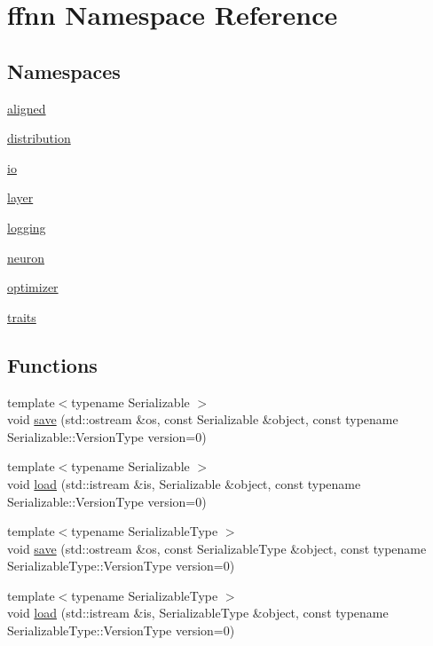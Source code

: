 \hypertarget{namespaceffnn}{\section{ffnn Namespace Reference}
\label{namespaceffnn}
}
\subsection*{Namespaces}
\begin{DoxyCompactItemize}
\item 
\hyperlink{namespaceffnn_1_1aligned}{aligned}
\item 
\hyperlink{namespaceffnn_1_1distribution}{distribution}
\item 
\hyperlink{namespaceffnn_1_1io}{io}
\item 
\hyperlink{namespaceffnn_1_1layer}{layer}
\item 
\hyperlink{namespaceffnn_1_1logging}{logging}
\item 
\hyperlink{namespaceffnn_1_1neuron}{neuron}
\item 
\hyperlink{namespaceffnn_1_1optimizer}{optimizer}
\item 
\hyperlink{namespaceffnn_1_1traits}{traits}
\end{DoxyCompactItemize}
\subsection*{Functions}
\begin{DoxyCompactItemize}
\item 
{\footnotesize template$<$typename Serializable $>$ }\\void \hyperlink{namespaceffnn_a1d292f830b9e27ce3965b0c18231b7fc}{save} (std\-::ostream \&os, const Serializable \&object, const typename Serializable\-::\-Version\-Type version=0)
\item 
{\footnotesize template$<$typename Serializable $>$ }\\void \hyperlink{namespaceffnn_a365753310c86d8142fa5b785cc16004a}{load} (std\-::istream \&is, Serializable \&object, const typename Serializable\-::\-Version\-Type version=0)
\item 
{\footnotesize template$<$typename Serializable\-Type $>$ }\\void \hyperlink{namespaceffnn_a25c692ab6bf9799deb7c4282ee85bdd6}{save} (std\-::ostream \&os, const Serializable\-Type \&object, const typename Serializable\-Type\-::\-Version\-Type version=0)
\item 
{\footnotesize template$<$typename Serializable\-Type $>$ }\\void \hyperlink{namespaceffnn_a94ff5b786bc42fa02bcf27ed86854a71}{load} (std\-::istream \&is, Serializable\-Type \&object, const typename Serializable\-Type\-::\-Version\-Type version=0)
\end{DoxyCompactItemize}



